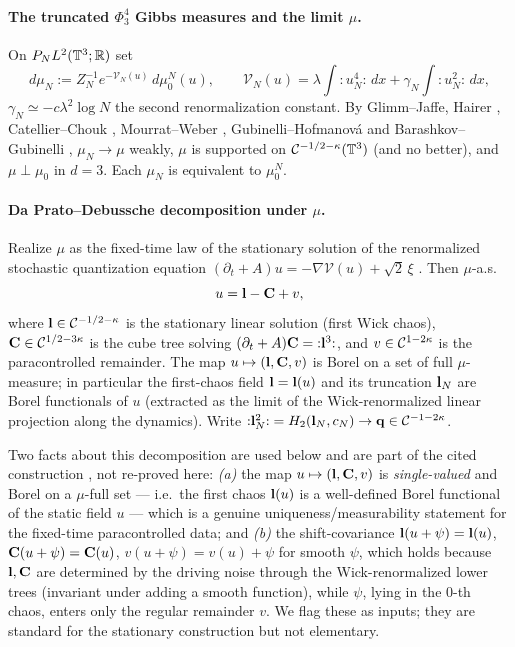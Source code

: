 \paragraph{The truncated $\Phi^4_3$ Gibbs measures and the limit $\mu$.}
On $P_N L^2(\mathbb{T}^3;\mathbb{R})$ set
\begin{equation}\label{eq:muN}
d\mu_N:=Z_N^{-1}e^{-\mathcal V_N(u)}\,d\mu_0^N(u),\qquad
\mathcal V_N(u)=\lambda\!\int\!{:}u_N^4{:}\,dx+\gamma_N\!\int\!{:}u_N^2{:}\,dx,
\end{equation}
$\gamma_N\simeq-c\lambda^2\log N$ the second renormalization constant. By Glimm--Jaffe,
Hairer \cite{Hairer14}, Catellier--Chouk \cite{CC18}, Mourrat--Weber \cite{MW17},
Gubinelli--Hofmanov\'a \cite{GH21} and Barashkov--Gubinelli \cite{BG20}, $\mu_N\to\mu$
weakly, $\mu$ is supported on $\mathcal{C}^{-1/2-\kappa}(\mathbb{T}^3)$ (and no better), and
$\mu\perp\mu_0$ in $d=3$. Each $\mu_N$ is equivalent to $\mu_0^N$.

\paragraph{Da Prato--Debussche decomposition under $\mu$.}
Realize $\mu$ as the fixed-time law of the stationary solution of the renormalized
stochastic quantization equation $(\partial_t+A)u=-\nabla\mathcal V(u)+\sqrt2\,\xi$
\cite{CC18,MW17,GH21}. Then $\mu$-a.s.
\begin{equation}\label{eq:DPD}
u=\mathbf{l}-\mathbf{C}+v,
\end{equation}
where $\mathbf{l}\in\mathcal{C}^{-1/2-\kappa}$ is the stationary linear solution (first Wick
chaos), $\mathbf{C}\in\mathcal{C}^{1/2-3\kappa}$ is the cube tree solving
$(\partial_t+A)\mathbf{C}={:}\mathbf{l}^3{:}$, and $v\in\mathcal{C}^{1-2\kappa}$ is the
paracontrolled remainder. The map $u\mapsto(\mathbf{l},\mathbf{C},v)$ is Borel on a set of
full $\mu$-measure; in particular the first-chaos field $\mathbf{l}=\mathbf{l}(u)$ and its
truncation $\mathbf{l}_N$ are Borel functionals of $u$ (extracted as the limit of the
Wick-renormalized linear projection along the dynamics). Write
${:}\mathbf{l}_N^2{:}=H_2(\mathbf{l}_N,c_N)\to\mathbf{q}\in\mathcal{C}^{-1-2\kappa}$.

\smallskip
Two facts about this decomposition are used below and are part of the cited construction
\cite{CC18,GH21}, not re-proved here: \emph{(a)} the map $u\mapsto(\mathbf{l},\mathbf{C},v)$
is \emph{single-valued} and Borel on a $\mu$-full set --- i.e.\ the first chaos
$\mathbf{l}(u)$ is a well-defined Borel functional of the static field $u$ --- which is a
genuine uniqueness/measurability statement for the fixed-time paracontrolled data; and
\emph{(b)} the shift-covariance $\mathbf{l}(u+\psi)=\mathbf{l}(u)$,
$\mathbf{C}(u+\psi)=\mathbf{C}(u)$, $v(u+\psi)=v(u)+\psi$ for smooth $\psi$, which holds
because $\mathbf{l},\mathbf{C}$ are determined by the driving noise through the
Wick-renormalized lower trees (invariant under adding a smooth function), while $\psi$,
lying in the $0$-th chaos, enters only the regular remainder $v$. We flag these as
inputs; they are standard for the stationary construction but not elementary.

